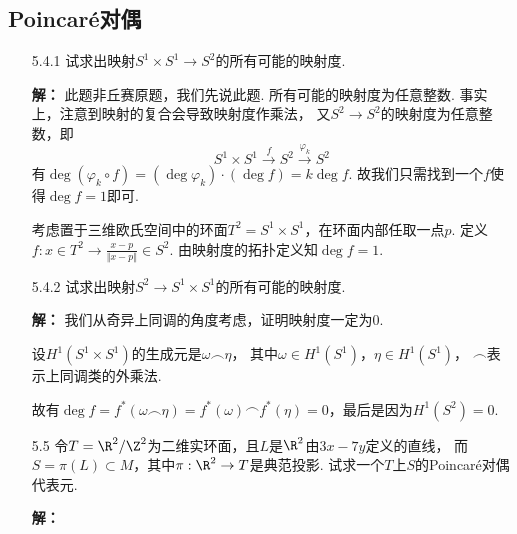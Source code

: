 \subsection{Poincaré对偶}
\begin{itemize}
    \item[5.4.1] 试求出映射$S^{1} \times S^{1} \to S^{2}$的所有可能的映射度.
    \item[\textbf{解：}]  \qquad 此题非丘赛原题，我们先说此题. 
    所有可能的映射度为任意整数. 事实上，注意到映射的复合会导致映射度作乘法，
    又$S^2\rightarrow S^2$的映射度为任意整数，即
        $$S^1\times S^1\stackrel{f}{\longrightarrow}S^2 
        \stackrel{\varphi_k}{\longrightarrow} S^2$$
    有$\deg (\varphi_k\circ f)=(\deg \varphi_k) \cdot (\deg f)=k\deg f$. 
    故我们只需找到一个$f$使得$\deg f=1$即可.\par
        \qquad 考虑置于三维欧氏空间中的环面$T^2=S^1\times S^1$，在环面内部任取一点$p$. 
        定义$f:x\in T^2\rightarrow \frac{x-p}{\Vert x-p\Vert}\in S^2$. 
        由映射度的拓扑定义知$\deg f=1$.

    \item[5.4.2] 试求出映射$S^{2}\rightarrow S^1 \times S^1$的所有可能的映射度.
    \item[\textbf{解：}] 
        \qquad 我们从奇异上同调的角度考虑，证明映射度一定为$0$.\par
        \qquad 设$H^1(S^1\times S^1)$的生成元是$\omega \smallfrown \eta$，
        其中$\omega\in H^1(S^1)$，$\eta\in H^1(S^1)$，
        $\smallfrown$表示上同调类的外乘法.\par
        \qquad 故有$\deg f=f^*(\omega \smallfrown \eta)
        =f^*(\omega)\smallfrown f^*(\eta)=0$，最后是因为$H^1(S^2)=0$.


    \item[5.5] 令$T = \R^{2}/\Z^{2}$为二维实环面，且$L$是$\R^{2}$由$3x-7y$定义的直线，
               而$S = \pi(L) \subset M$，其中$\pi:\R^{2} \to T$是典范投影.
               试求一个$T$上$S$的Poincaré对偶代表元.
    \item[\textbf{解：}]               
\end{itemize}

